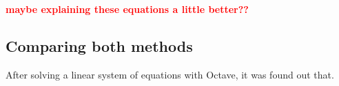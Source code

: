 
\par
\textcolor{red}{\textbf{maybe explaining these equations a little better??}}


\subsection{Comparing both methods}
\par
After solving a linear system of equations with Octave, it was found out that. 
